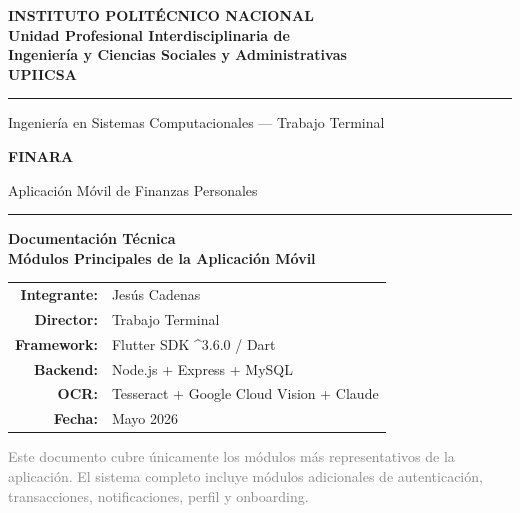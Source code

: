 \documentclass[12pt, letterpaper]{article}
\begin{document}
\begin{titlepage}
  \centering
  \vspace*{1.5cm}

  {\Large\bfseries\color{azulipn}
    INSTITUTO POLITÉCNICO NACIONAL\\[0.3em]
    \normalsize Unidad Profesional Interdisciplinaria de\\
    Ingeniería y Ciencias Sociales y Administrativas\\[0.2em]
    UPIICSA
  }\par
  \vspace{0.5cm}
  \textcolor{azulipn}{\rule{0.7\textwidth}{0.8pt}}\par
  \vspace{0.4cm}
  {\small Ingeniería en Sistemas Computacionales — Trabajo Terminal}\par

  \vspace{1.6cm}
  {\Huge\bfseries\color{verdefinara} FINARA}\par
  \vspace{0.3cm}
  {\large\color{gristexto} Aplicación Móvil de Finanzas Personales}\par
  \vspace{1.2cm}
  \textcolor{bordesutil}{\rule{0.5\textwidth}{0.4pt}}\par
  \vspace{0.8cm}

  {\LARGE\bfseries Documentación Técnica\\[0.2em]
   \large\normalfont Módulos Principales de la Aplicación Móvil}\par

  \vspace{1.4cm}
  \begin{tabular}{rl}
    \textbf{Integrante:}   & Jesús Cadenas \\[4pt]
    \textbf{Director:}     & Trabajo Terminal \\[4pt]
    \textbf{Framework:}    & Flutter SDK \textasciicircum 3.6.0 / Dart \\[4pt]
    \textbf{Backend:}      & Node.js + Express + MySQL \\[4pt]
    \textbf{OCR:}          & Tesseract + Google Cloud Vision + Claude \\[4pt]
    \textbf{Fecha:}        & Mayo 2026 \\
  \end{tabular}

  \vfill
  \textcolor{gray}{\footnotesize
    Este documento cubre únicamente los módulos más representativos
    de la aplicación. El sistema completo incluye módulos adicionales
    de autenticación, transacciones, notificaciones, perfil y onboarding.
  }
\end{titlepage}
\end{document}
